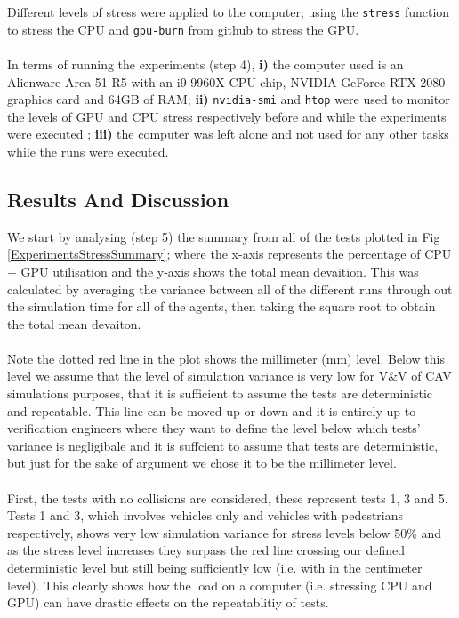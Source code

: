 Different levels of stress were applied to the computer; using the \texttt{stress} function \cite{CPU_stress} to stress the CPU and \texttt{gpu-burn} from github \cite{GPU_stress} to stress the GPU.\\\\ 
In terms of running the experiments (step 4), \textbf{i)} the computer used is an Alienware Area 51 R5 with an i9 9960X CPU chip, NVIDIA GeForce RTX 2080 graphics card and 64GB of RAM; \textbf{ii)} \texttt{nvidia-smi} and \texttt{htop} were used to monitor the levels of GPU and CPU stress respectively before and while the experiments were executed \cite{monitoring_stresses}; \textbf{iii)} the computer was left alone and not used for any other tasks while the runs were executed.

\subsection{Results And Discussion}\label{ResultsSection}
\noindent We start by analysing (step 5) the summary from all of the tests plotted in Fig \ref{ExperimentsStressSummary}; where the x-axis represents the percentage of CPU + GPU utilisation and the y-axis shows the total mean devaition. 
This was calculated by averaging the variance between all of the different runs through out the simulation time for all of the agents, then taking the square root to obtain the total mean devaiton.\\\\
Note the dotted red line in the plot shows the millimeter (mm) level. 
Below this level we assume that the level of simulation variance is very low for V\&V of CAV simulations purposes, that it is sufficient to assume the tests are deterministic and repeatable. 
This line can be moved up or down and it is entirely up to verification engineers where they want to define the level below which tests' variance is negligibale and it is suffcient to assume that tests are deterministic, but just for the sake of argument we chose it to be the millimeter level.\\\\
First, the tests with no collisions are considered, these represent tests 1, 3 and 5.
Tests 1 and 3, which involves vehicles only and vehicles with pedestrians respectively, shows very low simulation variance for stress levels below 50\% and as the stress level increases they surpass the red line crossing our defined deterministic level but still being sufficiently low (i.e. with in the centimeter level). This clearly shows how the load on a computer (i.e. stressing CPU and GPU) can have drastic effects on the repeatablitiy of tests.
